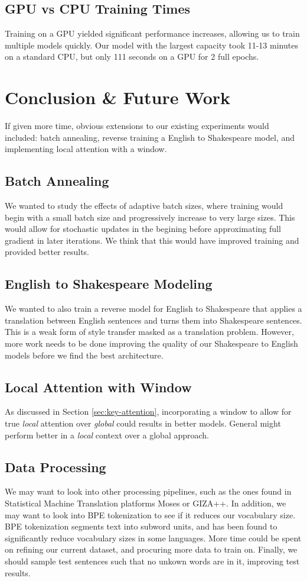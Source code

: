 \documentclass[twoside,twocolumn]{article}
\begin{document}
\subsection{GPU vs CPU Training Times}
Training on a GPU yielded significant performance increases, allowing us to
train multiple models quickly. Our model with the largest capacity took 11-13
minutes on a standard CPU, but only 111 seconds on a GPU for 2 full epochs.
\section{Conclusion \& Future Work}
\label{sec:conclusion}
If given more time, obvious extensions to our existing experiments would
included: batch annealing, reverse training a English to Shakespeare model,
and implementing local attention with a window.
\subsection{Batch Annealing}
We wanted to study the effects of adaptive batch sizes, where training would
begin with a small batch size and progressively increase to very large sizes.
This would allow for stochastic updates in the begining before approximating
full gradient in later iterations. We think that this would have improved
training and provided better results.
\subsection{English to Shakespeare Modeling}
We wanted to also train a reverse model for English to Shakespeare that applies
a translation between English sentences and turns them into Shakespeare sentences. This
is a weak form of style transfer masked as a translation problem. However, more
work needs to be done improving the quality of our Shakespeare to English models
before we find the best architecture.
\subsection{Local Attention with Window}
As discussed in Section \ref{sec:key-attention}, incorporating a window to allow
for true \emph{local} attention over \emph{global} could results in better
models. General might perform better in a \emph{local} context over a global
approach.
\subsection{Data Processing}
We may want to look into other processing pipelines, such as the ones found
in Statistical Machine Translation platforms Moses or GIZA++. In addition,
we may want to look into BPE tokenization to see if it reduces our vocabulary
size. BPE tokenization segments text into subword units, and has been found
to significantly reduce vocabulary sizes in some languages. More time could be
spent on refining our current dataset, and procuring more data to train on.
Finally, we should sample test sentences such that no unkown words are in it,
improving test results.
\end{document}

